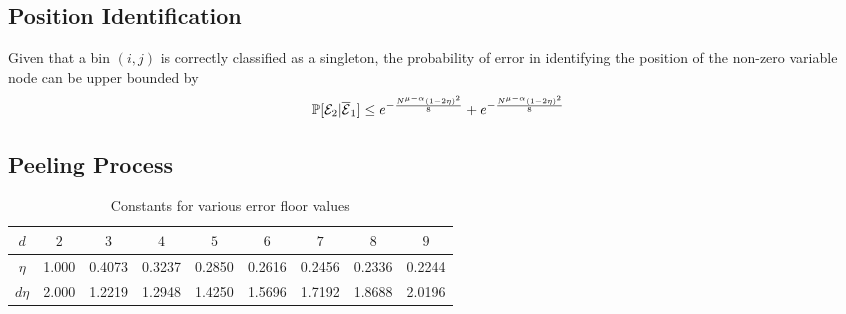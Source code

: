 \subsection{\bf Position Identification}
\begin{lemma}
Given that a bin $(i,j)$ is correctly classified as a singleton, the probability of error in identifying the position of the non-zero variable node can be upper bounded by
\begin{align*}
\mathbb{P}[\mathcal{E}_2|\overline{\mathcal{E}}_1]\leq e^{-\frac{N^{\mu-\alpha}(1-2\eta)^2}{8}}+e^{-\frac{N^{\mu-\alpha}(1-2\eta)^2}{8}}
\end{align*}
\end{lemma}

\subsection{\bf Peeling Process}
\begin{table}[h]
\centering
\begin{tabular}{| c | c | c | c | c | c | c | c | c | }
\hline
$d$ & $2$& $3$ & $4$ & $5$ & $6$ & $7$ & $8$ & $9$ \\ \hline
$\eta$ & 1.000 & 0.4073 & 0.3237 & 0.2850 & 0.2616 & 0.2456 & 0.2336 & 0.2244 \\ \hline
 $d\eta$ & 2.000 & 1.2219 & 1.2948 & 1.4250 & 1.5696 & 1.7192 & 1.8688 & 2.0196 \\ \hline
\end{tabular}
\vspace{1ex}
\caption{Constants for various error floor values}
\label{Table:EtaValues}
\end{table}

